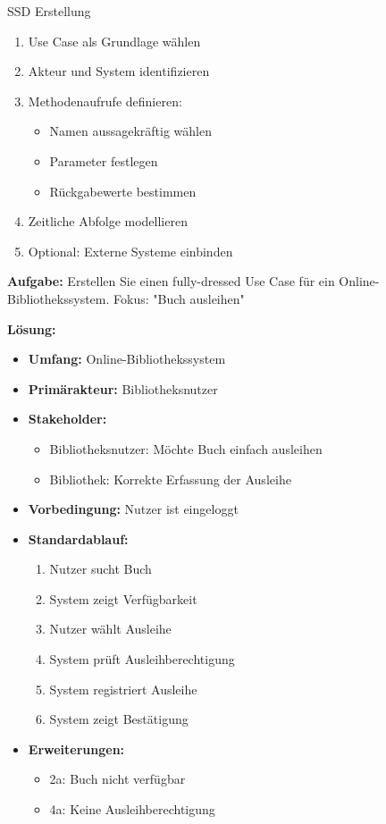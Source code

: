 \begin{KR}{SSD Erstellung}
\begin{enumerate}
    \item Use Case als Grundlage wählen
    \item Akteur und System identifizieren
    \item Methodenaufrufe definieren:
    \begin{itemize}
        \item Namen aussagekräftig wählen
        \item Parameter festlegen
        \item Rückgabewerte bestimmen
    \end{itemize}
    \item Zeitliche Abfolge modellieren
    \item Optional: Externe Systeme einbinden
\end{enumerate}
\end{KR}

\begin{example}
\textbf{Aufgabe:} Erstellen Sie einen fully-dressed Use Case für ein Online-Bibliothekssystem. Fokus: "Buch ausleihen"

\textbf{Lösung:}
\begin{itemize}
    \item \textbf{Umfang:} Online-Bibliothekssystem
    \item \textbf{Primärakteur:} Bibliotheksnutzer
    \item \textbf{Stakeholder:} 
    \begin{itemize}
        \item Bibliotheksnutzer: Möchte Buch einfach ausleihen
        \item Bibliothek: Korrekte Erfassung der Ausleihe
    \end{itemize}
    \item \textbf{Vorbedingung:} Nutzer ist eingeloggt
    \item \textbf{Standardablauf:}
    \begin{enumerate}
        \item Nutzer sucht Buch
        \item System zeigt Verfügbarkeit
        \item Nutzer wählt Ausleihe
        \item System prüft Ausleihberechtigung
        \item System registriert Ausleihe
        \item System zeigt Bestätigung
    \end{enumerate}
    \item \textbf{Erweiterungen:}
    \begin{itemize}
        \item 2a: Buch nicht verfügbar
        \item 4a: Keine Ausleihberechtigung
    \end{itemize}
\end{itemize}
\end{example}
